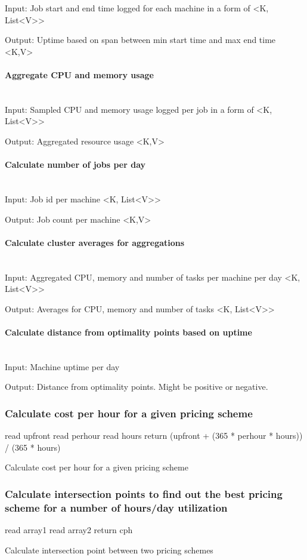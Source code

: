 \documentclass[]{final_report}
\newcommand{\myparagraph}[1]{\paragraph{#1}\mbox{}\\}
\begin{document}
Input: Job start and end time logged for each machine in a form of \textless K, List\textless V\textgreater\textgreater

Output: Uptime based on span between min start time and max end time \textless K,V\textgreater

\myparagraph{Aggregate CPU and memory usage}
Input: Sampled CPU and memory usage logged per job in a form of \textless K, List\textless V\textgreater\textgreater

Output: Aggregated resource usage \textless K,V\textgreater

\myparagraph{Calculate number of jobs per day}
Input: Job id per machine \textless K, List\textless V\textgreater\textgreater

Output: Job count per machine \textless K,V\textgreater

\myparagraph{Calculate cluster averages for aggregations}
Input: Aggregated CPU, memory and number of tasks per machine per day \textless K, List\textless V\textgreater\textgreater

Output: Averages for CPU, memory and number of tasks \textless K, List\textless V\textgreater\textgreater

\myparagraph{Calculate distance from optimality points based on uptime}
Input: Machine uptime per day

Output: Distance from optimality points. Might be positive or negative. 

\subsubsection{Calculate cost per hour for a given pricing scheme}

\begin{algorithm}[H]
 read upfront\;
 read perhour\;
 read hours\;	
 return (upfront + (365 * perhour * hours)) / (365 * hours)
 \caption{Calculate cost per hour for a given pricing scheme}
\end{algorithm}

\subsubsection{Calculate intersection points to find out the best pricing scheme for a number of hours/day utilization}

\begin{algorithm}[H]
 read array1\;
 read array2\;
  {
 	 {
 		return cph
 	}
 }
\caption{Calculate intersection point between two pricing schemes}
\end{algorithm}
\end{document}
